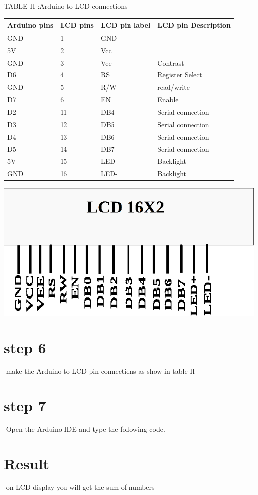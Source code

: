 \documentclass[twocolumn,13pt]{article}
\begin{document}
\begin{center}
    TABLE II :Arduino to LCD connections
\end{center}
 \begin{tabular}{ |p{1.5cm}|p{1.5cm}|p{1.5cm}|p{1.5cm}| }
 \hline
 \setlength{\tabcolsep}{3pt}
Arduino pins & LCD pins & LCD pin label & LCD pin Description\\
\hline
 GND & 1& GND & \\
 \hline
 5V & 2 & Vcc &\\
 \hline
 GND & 3 & Vee & Contrast\\
 \hline
 D6 & 4 & RS & Register Select\\
 \hline
 GND & 5 & R/W & read/write\\
 \hline
 D7 & 6 & EN &Enable\\
 \hline
 D2 & 11 & DB4 & Serial connection\\
 \hline
 D3 & 12 & DB5 & Serial connection\\
 \hline
 D4 & 13 & DB6 & Serial connection\\
 \hline
 D5 & 14 & DB7 & Serial connection\\
 \hline
 5V & 15 & LED+ & Backlight\\
 \hline
 GND & 16 & LED- & Backlight\\
 \hline
\end{tabular}



\includegraphics[scale=0.3]{../assembly_assignment/figs/lcd.png} 




\section*{step 6}
-make the Arduino to LCD pin connections as show in  table II
\section*{step 7}
-Open the Arduino IDE and type the following code.

\section*{Result}
-on LCD display you will get the sum of numbers 
\end{document}
